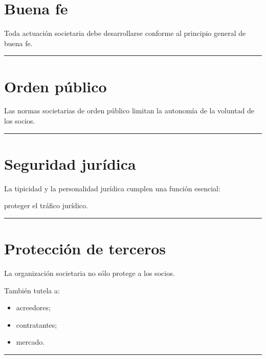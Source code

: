 \documentclass[
  spanish,
  letterpaper,
  DIV=11,
  numbers=noendperiod]{scrartcl}
\providecommand{\tightlist}{%
  \setlength{\itemsep}{0pt}\setlength{\parskip}{0pt}}
\begin{document}
\section{Buena fe}\label{buena-fe}

Toda actuación societaria debe desarrollarse conforme al principio
general de buena fe.

\begin{center}\rule{0.5\linewidth}{0.5pt}\end{center}

\section{Orden público}\label{orden-puxfablico}

Las normas societarias de orden público limitan la autonomía de la
voluntad de los socios.

\begin{center}\rule{0.5\linewidth}{0.5pt}\end{center}

\section{Seguridad jurídica}\label{seguridad-juruxeddica}

La tipicidad y la personalidad jurídica cumplen una función esencial:

proteger el tráfico jurídico.

\begin{center}\rule{0.5\linewidth}{0.5pt}\end{center}

\section{Protección de terceros}\label{protecciuxf3n-de-terceros}

La organización societaria no sólo protege a los socios.

También tutela a:

\begin{itemize}
\tightlist
\item
  acreedores;
\item
  contratantes;
\item
  mercado.
\end{itemize}

\begin{center}\rule{0.5\linewidth}{0.5pt}\end{center}
\end{document}
